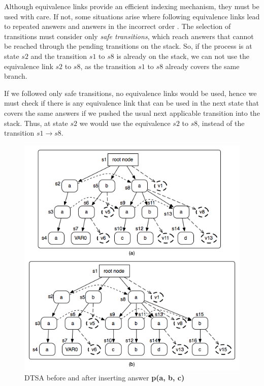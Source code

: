   Although equivalence links provide an efficient indexing mechanism, they must be used with care. If not,
  some situations arise where following equivalence links lead to repeated answers and answers in the incorrect order \cite{Rao-96}.
  The selection of transitions must consider only \textit{safe transitions}, which reach answers that cannot be reached through the pending
  transitions on the stack.
  So, if the process is at state $s2$ and the transition $s1$ to $s8$ is already on the
  stack, we can not use the equivalence link $s2$ to $s8$, as the transition $s1$ to $s8$ already covers the same branch.
  
  If we followed only safe transitions, no equivalence links would be used, hence we must check if there is any
  equivalence link that can be used in the next state that covers the same answers if we pushed the
  usual next applicable transition into the stack. Thus, at state $s2$ we would use the equivalence $s2$ to $s8$, instead of
  the transition $s1 \rightarrow s8$.
  
  \begin{figure}[ht]
    \centering
      \includegraphics[scale=0.6]{dtsa.png}
    \caption{DTSA before and after inserting answer \textbf{p(a, b, c)}}
    \label{fig:dtsa_example}
  \end{figure}
   
